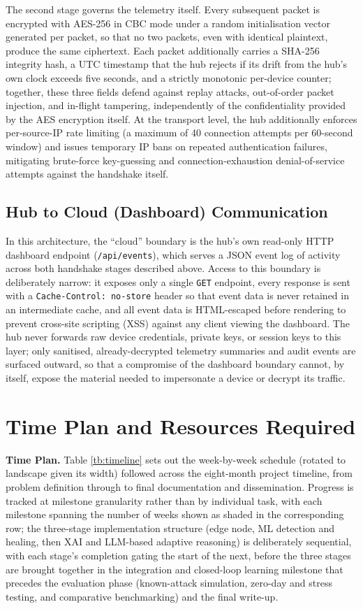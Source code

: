 The second stage governs the telemetry itself. Every subsequent packet is encrypted with AES-256 in CBC mode under a random initialisation vector generated per packet, so that no two packets, even with identical plaintext, produce the same ciphertext. Each packet additionally carries a SHA-256 integrity hash, a UTC timestamp that the hub rejects if its drift from the hub's own clock exceeds five seconds, and a strictly monotonic per-device counter; together, these three fields defend against replay attacks, out-of-order packet injection, and in-flight tampering, independently of the confidentiality provided by the AES encryption itself. At the transport level, the hub additionally enforces per-source-IP rate limiting (a maximum of 40 connection attempts per 60-second window) and issues temporary IP bans on repeated authentication failures, mitigating brute-force key-guessing and connection-exhaustion denial-of-service attempts against the handshake itself.

\subsection{Hub to Cloud (Dashboard) Communication}

In this architecture, the ``cloud'' boundary is the hub's own read-only HTTP dashboard endpoint (\texttt{/api/events}), which serves a JSON event log of activity across both handshake stages described above. Access to this boundary is deliberately narrow: it exposes only a single \texttt{GET} endpoint, every response is sent with a \texttt{Cache-Control: no-store} header so that event data is never retained in an intermediate cache, and all event data is HTML-escaped before rendering to prevent cross-site scripting (XSS) against any client viewing the dashboard. The hub never forwards raw device credentials, private keys, or session keys to this layer; only sanitised, already-decrypted telemetry summaries and audit events are surfaced outward, so that a compromise of the dashboard boundary cannot, by itself, expose the material needed to impersonate a device or decrypt its traffic.

\section{Time Plan and Resources Required}

\textbf{Time Plan.} Table \ref{tb:timeline} sets out the week-by-week schedule (rotated to landscape given its width) followed across the eight-month project timeline, from problem definition through to final documentation and dissemination. Progress is tracked at milestone granularity rather than by individual task, with each milestone spanning the number of weeks shown as shaded in the corresponding row; the three-stage implementation structure (edge node, ML detection and healing, then XAI and LLM-based adaptive reasoning) is deliberately sequential, with each stage's completion gating the start of the next, before the three stages are brought together in the integration and closed-loop learning milestone that precedes the evaluation phase (known-attack simulation, zero-day and stress testing, and comparative benchmarking) and the final write-up.

